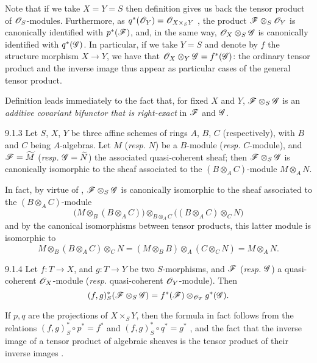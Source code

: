 Note that if we take $X=Y=S$ then definition  gives us back the tensor
product of $\mathscr{O}_S$-modules. Furthermore, as $q^*(\mathscr{O}_Y)=\mathscr{O}_{X\times_S Y}$
, the product $\mathscr{F}\otimes_S\mathscr{O}_Y$ is canonically
identified with $p^*(\mathscr{F})$, and, in the same way,
$\mathscr{O}_X\otimes_S\mathscr{G}$ is canonically identified with $q^*(\mathscr{G})$. In
particular, if we take $Y=S$ and denote by $f$ the structure morphism $X\to Y$,
we have that $\mathscr{O}_X\otimes_Y\mathscr{G}=f^*(\mathscr{G})$: the ordinary tensor
product and the inverse image thus appear as particular cases of the general
tensor product.

Definition  leads immediately to the fact that, for fixed $X$ and
$Y$, $\mathscr{F}\otimes_S\mathscr{G}$ is an \emph{additive covariant bifunctor that
is right-exact} in $\mathscr{F}$ and $\mathscr{G}$.

\begin{envs}[Proposition]{9.1.3}
\label{prop-1.9.1.3}
Let $S$, $X$, $Y$ be three affine schemes of rings
$A$, $B$, $C$ (respectively), with $B$ and $C$ being $A$-algebras. Let $M$
(\emph{resp.} $N$) be a $B$-module (\emph{resp.} $C$-module), and
$\mathscr{F}=\widetilde{M}$ (\emph{resp.} $\mathscr{G}=\widetilde{N}$) the
associated quasi-coherent sheaf; then $\mathscr{F}\otimes_S\mathscr{G}$ is
canonically isomorphic to the sheaf associated to the $(B\otimes_A C)$-module
$M\otimes_A N$.
\end{envs}

In fact, by virtue of , $\mathscr{F}\otimes_S\mathscr{G}$
is canonically isomorphic to the sheaf associated to the $(B\otimes_A C)$-module
\[
  \big(M\otimes_B(B\otimes_A C)\big)\otimes_{B\otimes_A C}\big((B\otimes_A C)\otimes_C N\big)
\]
and by the canonical isomorphisms between tensor
products, this latter module is isomorphic to
\[
  M\otimes_B(B\otimes_A C)\otimes_C N=(M\otimes_B B)\otimes_A(C\otimes_C N)=M\otimes_A N.
\]

\begin{envs}[Proposition]{9.1.4}
\label{prop-1.9.1.4}
Let $f:T\to X$, and $g:T\to Y$ be
two $S$-morphisms, and $\mathscr{F}$ (\emph{resp.} $\mathscr{G}$) a quasi-coherent
$\mathscr{O}_X$-module (\emph{resp.} quasi-coherent $\mathscr{O}_Y$-module). Then
\[
  (f,g)^*_S(\mathscr{F}\otimes_S\mathscr{G})=f^*(\mathscr{F})\otimes_{\mathscr{O}_T}g^*(\mathscr{G}).
\]
\end{envs}

If $p,q$ are the projections of $X\times_S Y$, then the formula in fact follows
from the relations $(f,g)^*_S\circ p^*=f^*$ and
$(f,g)^*_S\circ q^*=g^*$ , and the fact that the inverse
image of a tensor product of algebraic sheaves is the tensor product of their inverse
images .

